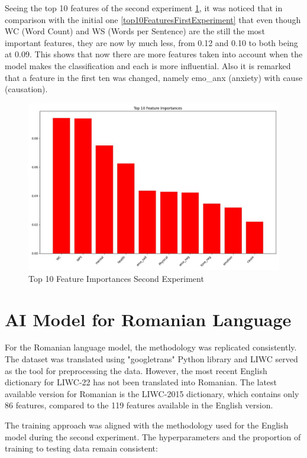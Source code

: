 \documentclass[3p,times,procedia]{elsarticle}
\begin{document}
Seeing the top 10 features of the second experiment \ref{top10FeaturesSecondExperiment}, it was noticed that in comparison with the initial one \ref{top10FeaturesFirstExperiment} that even though WC (Word Count) and WS (Words per Sentence) are the still the most important features, they are now by much less, from 0.12 and 0.10 to both being at 0.09. This shows that now there are more features taken into account when the model makes the classification and each is more influential. Also it is remarked that a feature in the first ten was changed, namely emo\_anx (anxiety) with cause (causation).

\begin{figure}[htbp]
	\centering
		\includegraphics[scale=0.5]{./figures/metrics/experiment2English/top10features.jpg}
	\caption{Top 10 Feature Importances Second Experiment}
	\label{top10FeaturesSecondExperiment}
\end{figure}

\section{AI Model for Romanian Language}

\quad For the Romanian language model, the methodology was replicated consistently. The dataset was translated using "googletrans" Python library \cite{googletranslib} and LIWC served as the tool for preprocessing the data. However, the most recent English dictionary for LIWC-22 has not been translated into Romanian. The latest available version for Romanian is the LIWC-2015 dictionary, which contains only 86 features, compared to the 119 features available in the English version.

The training approach was aligned with the methodology used for the English model during the second experiment. The hyperparameters and the proportion of training to testing data remain consistent:
\end{document}
